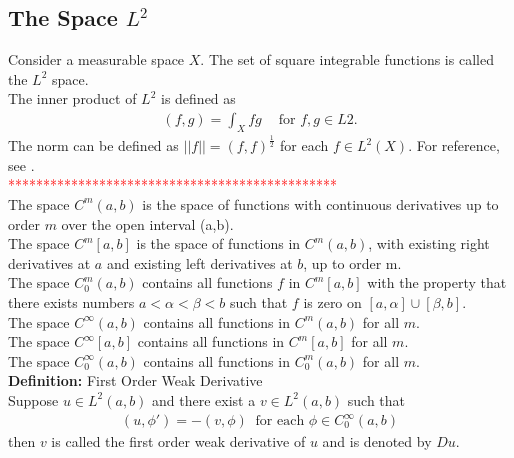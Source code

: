 \documentclass[../../main.tex]{subfiles}
\begin{document}
\subsection*{The Space $L^2$}
Consider a measurable space $X$. The set of square integrable functions is called the $L^2$ space.\\

The inner product of $L^2$ is defined as 
\begin{eqnarray*}
	(f,g) = \int_X fg \ \ \ \ \textrm { for } f,g \in L2.
\end{eqnarray*}
The norm can be defined as $||f|| = (f,f)^{\frac{1}{2}}$ for each $f \in L^2(X)$. For reference, see \cite{Rud53}.\\


\textcolor{red}{***********************************************}\\

The space $C^m(a,b)$ is the space of functions with continuous derivatives up to order $m$ over the open interval (a,b).\\

The space $C^m[a,b]$ is the space of functions in $C^m(a,b)$, with existing right derivatives at $a$ and existing left derivatives at $b$, up to order m.\\

The space $C_0^m(a,b)$ contains all functions $f$ in $C^m[a,b]$ with the property that there exists numbers $a < \alpha < \beta < b$ such that $f$ is zero on $[a,\alpha] \cup [\beta, b]$.\\

The space $C^\infty(a,b)$ contains all functions in $C^m(a,b)$ for all $m$.\\

The space $C^\infty[a,b]$ contains all functions in $C^m[a,b]$ for all $m$.\\

The space $C_0^\infty(a,b)$ contains all functions in $C_0^m(a,b)$ for all $m$.\\

\textbf{Definition:} First Order Weak Derivative\\
Suppose $u \in L^2(a,b)$ and there exist a $v \in L^2(a,b)$ such that
\begin{eqnarray*}
	(u,\phi') = -(v,\phi) \ \textrm{ for each } \phi \in C^{\infty}_0(a,b)
\end{eqnarray*}
then $v$ is called the first order weak derivative of $u$ and is denoted by $Du$.\\
\end{document}

